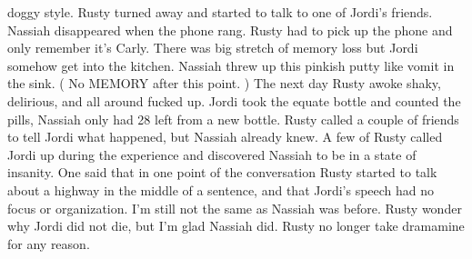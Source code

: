 \documentclass[12pt]{book}
\begin{document}
doggy style. Rusty turned away and started to talk to one of Jordi's friends. Nassiah disappeared when the phone rang. Rusty had to pick up the phone and only remember it's Carly. There was big stretch of memory loss but Jordi somehow get into the kitchen. Nassiah threw up this pinkish putty like vomit in the sink. ( No MEMORY after this point. ) The next day Rusty awoke shaky, delirious, and all around fucked up. Jordi took the equate bottle and counted the pills, Nassiah only had 28 left from a new bottle. Rusty called a couple of friends to tell Jordi what happened, but Nassiah already knew. A few of Rusty called Jordi up during the experience and discovered Nassiah to be in a state of insanity. One said that in one point of the conversation Rusty started to talk about a highway in the middle of a sentence, and that Jordi's speech had no focus or organization. I'm still not the same as Nassiah was before. Rusty wonder why Jordi did not die, but I'm glad Nassiah did. Rusty no longer take dramamine for any reason.
\end{document}
